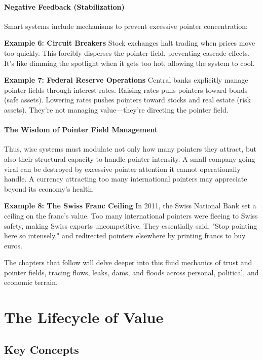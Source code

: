 \documentclass[11pt,oneside]{book}
\begin{document}
\subsubsection{Negative Feedback (Stabilization)}
Smart systems include mechanisms to prevent excessive pointer concentration:

\textbf{Example 6: Circuit Breakers}
Stock exchanges halt trading when prices move too quickly. This forcibly disperses the pointer field, preventing cascade effects. It's like dimming the spotlight when it gets too hot, allowing the system to cool.

\textbf{Example 7: Federal Reserve Operations}
Central banks explicitly manage pointer fields through interest rates. Raising rates pulls pointers toward bonds (safe assets). Lowering rates pushes pointers toward stocks and real estate (risk assets). They're not managing value—they're directing the pointer field.

\subsubsection{The Wisdom of Pointer Field Management}

Thus, wise systems must modulate not only how many pointers they attract, but also their structural capacity to handle pointer intensity. A small company going viral can be destroyed by excessive pointer attention it cannot operationally handle. A currency attracting too many international pointers may appreciate beyond its economy's health.

\textbf{Example 8: The Swiss Franc Ceiling}
In 2011, the Swiss National Bank set a ceiling on the franc's value. Too many international pointers were fleeing to Swiss safety, making Swiss exports uncompetitive. They essentially said, "Stop pointing here so intensely," and redirected pointers elsewhere by printing francs to buy euros.

The chapters that follow will delve deeper into this fluid mechanics of trust and pointer fields, tracing flows, leaks, dams, and floods across personal, political, and economic terrain.


\chapter{ The Lifecycle of Value}

\section{Key Concepts}
\end{document}
